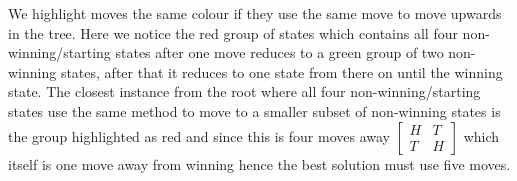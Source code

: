 \documentclass{article}
\begin{document}
We highlight moves the same colour if they use the same move to move upwards in the tree. Here we notice the red group of states which contains all four non-winning/starting states after one move reduces to a green group of two non-winning states, after that it reduces to one state from there on until the winning state. The closest instance from the root where all four non-winning/starting states use the same method to move to a smaller subset of non-winning states is the group highlighted as red and since this is four moves away {$\begin{bmatrix} H & T \\ T & H \end{bmatrix}$} which itself is one move away from winning hence the best solution must use five moves. 
\end{document}
